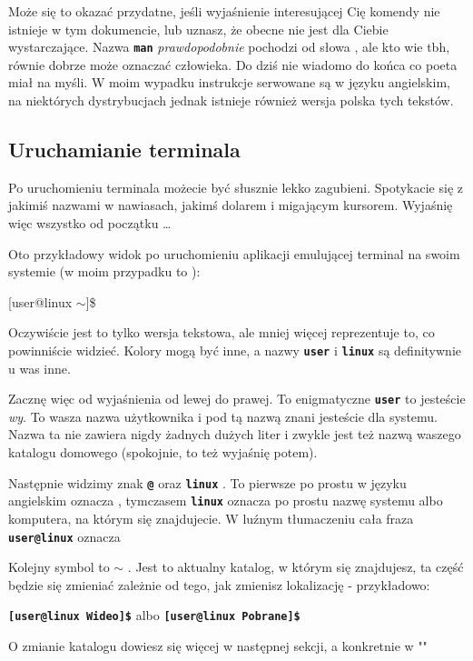 \documentclass[12pt]{article}
\makeatletter
\newcommand{\ttbf}[1]{
    \texttt{\textbf{#1}}
}
\newenvironment{console1}
{
    \ttfamily
    \fontseries{b}
    \selectfont
    {[}user@linux $\sim${]}\$} {

    }
\makeatother
\begin{document}
Może się to okazać przydatne, jeśli wyjaśnienie interesującej Cię komendy nie istnieje w tym dokumencie, lub uznasz, że obecne nie jest dla Ciebie wystarczające. Nazwa \ttbf{man} \emph{prawdopodobnie} pochodzi od słowa , ale kto wie tbh, równie dobrze może oznaczać człowieka. Do dziś nie wiadomo do końca co poeta miał na myśli. W moim wypadku instrukcje serwowane są w języku angielskim, na niektórych dystrybucjach jednak istnieje również wersja polska tych tekstów.

\subsection{Uruchamianie terminala}
Po uruchomieniu terminala możecie być słusznie lekko zagubieni. Spotykacie się z jakimiś nazwami w nawiasach, jakimś dolarem i migającym kursorem. Wyjaśnię więc wszystko od początku \dots

Oto przykładowy widok po uruchomieniu aplikacji emulującej terminal na swoim systemie (w moim przypadku to ):

\begin{console1}

\end{console1}

Oczywiście jest to tylko wersja tekstowa, ale mniej więcej reprezentuje to, co powinniście widzieć. Kolory mogą być inne, a nazwy \ttbf{user} i \ttbf{linux} są definitywnie u was inne.

Zacznę więc od wyjaśnienia od lewej do prawej. To enigmatyczne \ttbf{user} to jesteście \emph{wy}. To wasza nazwa użytkownika i pod tą nazwą znani jesteście dla systemu. Nazwa ta nie zawiera nigdy żadnych dużych liter i zwykle jest też nazwą waszego katalogu domowego (spokojnie, to też wyjaśnię potem).

Następnie widzimy znak \ttbf{@} oraz \ttbf{linux}. To pierwsze po prostu w języku angielskim  oznacza , tymczasem \ttbf{linux} oznacza po prostu nazwę systemu albo komputera, na którym się znajdujecie. W luźnym tłumaczeniu cała fraza \ttbf{user@linux} oznacza 

Kolejny symbol to \ttbf{$\sim$}. Jest to aktualny katalog, w którym się znajdujesz, ta część będzie się zmieniać zależnie od tego, jak zmienisz lokalizację - przykładowo:

\ttbf{[user@linux Wideo]\$} albo \ttbf{[user@linux Pobrane]\$}

O zmianie katalogu dowiesz się więcej w następnej sekcji, a konkretnie w ""
\end{document}
